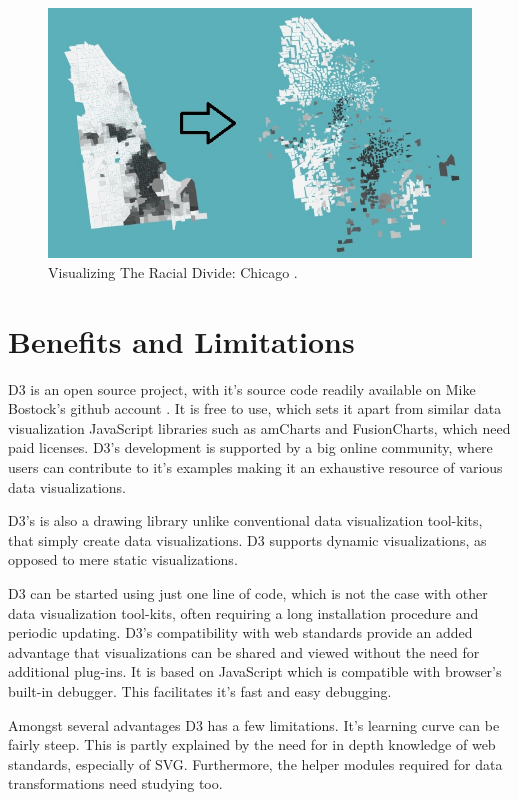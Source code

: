 \documentclass[9pt,twocolumn,twoside]{../../styles/osajnl}
\begin{document}
\begin{figure}[h]
\centering
\includegraphics[scale=0.4]{images/4}
\centering
\caption{Visualizing The Racial Divide: Chicago \cite{www-chicago}.}
\end{figure}



\section{Benefits and Limitations}
D3 is an open source project, with it's source code readily available on Mike Bostock's github account \cite{www-mike}. It is free to use, which sets it apart from similar data visualization JavaScript libraries such as amCharts and FusionCharts, which need paid licenses. D3's development is supported by a big online community, where users can contribute to it's examples making it an exhaustive resource of various data visualizations.

D3's is also a drawing library unlike conventional data visualization tool-kits, that simply create data visualizations. D3 supports dynamic visualizations, as opposed to mere static visualizations.

D3 can be started using just one line of code, which is not the case with other data visualization tool-kits, often requiring a long installation procedure and periodic updating. D3's compatibility with web standards provide an added advantage that visualizations can be shared and viewed without the need for additional plug-ins. It is based on JavaScript which is compatible with browser’s built-in debugger. This facilitates it's fast and easy debugging.

Amongst several advantages D3 has a few limitations. It's  learning curve can be fairly steep. This is partly explained by the need for in depth knowledge of web standards, especially of SVG. Furthermore, the helper modules required for data transformations need studying too.
\end{document}
